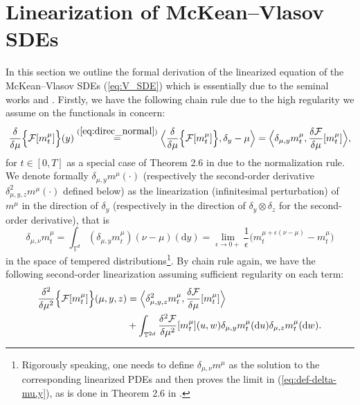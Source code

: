 \section{Linearization of McKean–Vlasov SDEs}\label{sec:append_lin} In this section we outline the formal derivation of the linearized equation of the McKean–Vlasov
SDEs (\ref{eq:V_SDE}) which is essentially due to the seminal works \cite{BLPC17} and \cite{CDLL19}. Firstly, we have the following chain rule due to the high regularity we assume on the functionals in concern:
\begin{equation}\label{eq:variation_mu_solution_first}
\frac{\delta}{\delta \mu} \Big\{\mathcal{F}[m_t^{\mu}]\Big\}(y) \overset{(\ref{eq:direc_normal})}{=} \Big\langle \frac{\delta}{\delta \mu} \Big\{\mathcal{F}[m_t^{\mu}]\Big\}, \delta_y - \mu\Big\rangle = \Big\langle \delta_{\mu,y} m_t^{\mu}, \frac{\delta \mathcal{F}}{\delta \mu}[m_t^{\mu}] \Big\rangle,
\end{equation}
for $t \in [0,T]$ as a special case of Theorem 2.6 in \cite{T21} due to the normalization rule. We denote formally $\delta_{\mu,y} m^{\mu}(\cdot)$ (respectively the second-order derivative $\delta^2_{\mu,y,z} m^{\mu}(\cdot)$ defined below) as the linearization (infinitesimal perturbation) of $m^{\mu}$ in the direction of $\delta_y$ (respectively in the direction of $\delta_y  \otimes \delta_z$ for the second-order derivative), that is 
\begin{equation}\label{eq:def-delta-mu,y}
\delta_{\mu,\nu}m_t^{\mu} = \int_{\mathbb{T}^d} (\delta_{\mu,y} m_t^{\mu}) (\nu - \mu)(\mathrm{d}y) = \lim_{\epsilon \to 0+} \frac{1}{\epsilon} \big(m_t^{\mu + \epsilon (\nu - \mu)} - m_t^{\mu}\big)
\end{equation}
in the space of tempered distributions\footnote{Rigorously speaking, one needs to define $\delta_{\mu,\nu}m^{\mu}$ as the solution to the corresponding linearized PDEs and then proves the limit in (\ref{eq:def-delta-mu,y}), as is done in Theorem 2.6 in \cite{T21}.}. By chain rule again, we have the following second-order linearization assuming sufficient regularity on each term:
\begin{equation}\label{eq:variation_mu_solution_second}
\begin{split}
\frac{\delta^2}{\delta \mu^2} \Big\{\mathcal{F}[m_t^{\mu}]\Big\}(\mu, y,z) & = \Big \langle \delta^2_{\mu,y,z} m_t^{\mu}, \frac{\delta \mathcal{F}}{\delta \mu}[m_t^{\mu}]  \Big\rangle\\
 & + \int_{\mathbb{T}^{2d}}  \frac{\delta^2 \mathcal{F}}{\delta \mu^2}[m_t^{\mu}](u,w) \delta_{\mu,y} m_t^{\mu}(\mathrm{d}u)  \delta_{\mu,z} m_t^{\mu}(\mathrm{d}w).
\end{split}
\end{equation}

